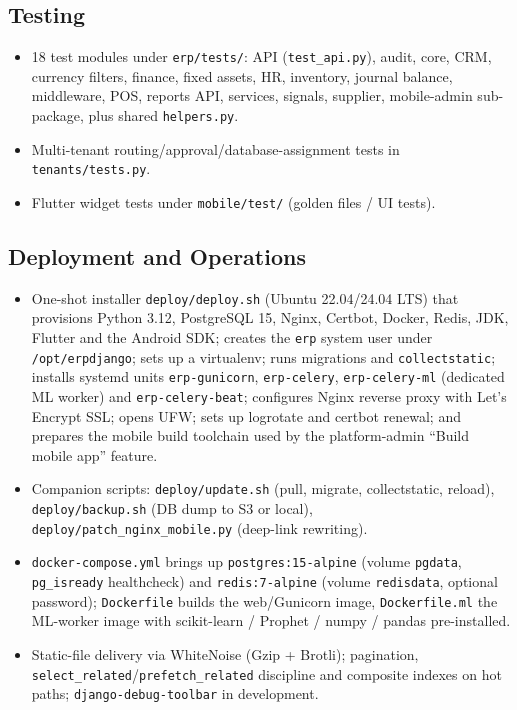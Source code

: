 \documentclass[12pt,a4paper]{report}
\begin{document}
\subsection{Testing}
\begin{itemize}
  \item 18 test modules under \texttt{erp/tests/}: API (\texttt{test\_api.py}), audit, core, CRM, currency filters, finance, fixed assets, HR, inventory, journal balance, middleware, POS, reports API, services, signals, supplier, mobile-admin sub-package, plus shared \texttt{helpers.py}.
  \item Multi-tenant routing/approval/database-assignment tests in \texttt{tenants/tests.py}.
  \item Flutter widget tests under \texttt{mobile/test/} (golden files / UI tests).
\end{itemize}

\subsection{Deployment and Operations}
\begin{itemize}
  \item One-shot installer \texttt{deploy/deploy.sh} (Ubuntu 22.04/24.04 LTS) that provisions Python 3.12, PostgreSQL 15, Nginx, Certbot, Docker, Redis, JDK, Flutter and the Android SDK; creates the \texttt{erp} system user under \texttt{/opt/erpdjango}; sets up a virtualenv; runs migrations and \texttt{collectstatic}; installs systemd units \texttt{erp-gunicorn}, \texttt{erp-celery}, \texttt{erp-celery-ml} (dedicated ML worker) and \texttt{erp-celery-beat}; configures Nginx reverse proxy with Let's Encrypt SSL; opens UFW; sets up logrotate and certbot renewal; and prepares the mobile build toolchain used by the platform-admin ``Build mobile app'' feature.
  \item Companion scripts: \texttt{deploy/update.sh} (pull, migrate, collectstatic, reload), \texttt{deploy/backup.sh} (DB dump to S3 or local), \texttt{deploy/patch\_nginx\_mobile.py} (deep-link rewriting).
  \item \texttt{docker-compose.yml} brings up \texttt{postgres:15-alpine} (volume \texttt{pgdata}, \texttt{pg\_isready} healthcheck) and \texttt{redis:7-alpine} (volume \texttt{redisdata}, optional password); \texttt{Dockerfile} builds the web/Gunicorn image, \texttt{Dockerfile.ml} the ML-worker image with scikit-learn / Prophet / numpy / pandas pre-installed.
  \item Static-file delivery via WhiteNoise (Gzip + Brotli); pagination, \texttt{select\_related}/\texttt{prefetch\_related} discipline and composite indexes on hot paths; \texttt{django-debug-toolbar} in development.
\end{itemize}
\end{document}

